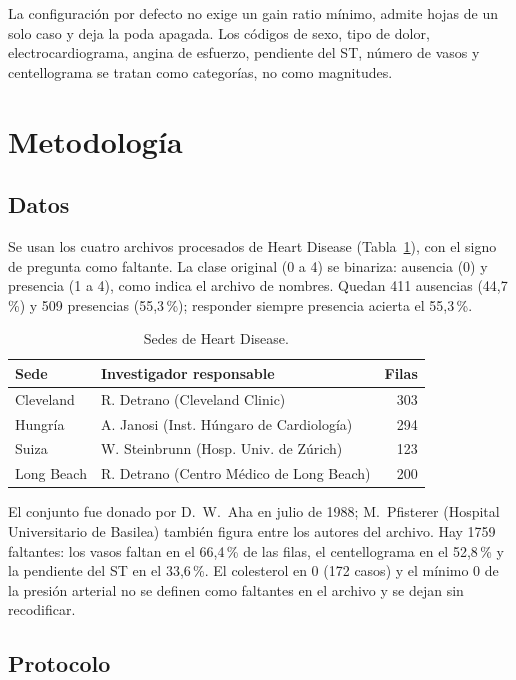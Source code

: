 \documentclass{llncs}
\begin{document}
La configuración por defecto no exige un gain ratio mínimo, admite hojas de un solo caso y deja la poda apagada. Los códigos de sexo, tipo de dolor, electrocardiograma, angina de esfuerzo, pendiente del ST, número de vasos y centellograma se tratan como categorías, no como magnitudes.

\section{Metodología}
\label{sec:metodologia}

\subsection{Datos}

Se usan los cuatro archivos procesados de Heart Disease \cite{heartdisease} (Tabla~\ref{tab:sedes}), con el signo de pregunta como faltante. La clase original (0 a 4) se binariza: ausencia (0) y presencia (1 a 4), como indica el archivo de nombres. Quedan 411 ausencias (44,7\,\%) y 509 presencias (55,3\,\%); responder siempre presencia acierta el 55,3\,\%.

\begin{table}[ht]
\centering
\caption{Sedes de Heart Disease.}
\label{tab:sedes}
\begin{tabular}{llr}
\toprule
Sede & Investigador responsable & Filas \\
\midrule
Cleveland & R. Detrano (Cleveland Clinic) & 303 \\
Hungría & A. Janosi (Inst. Húngaro de Cardiología) & 294 \\
Suiza & W. Steinbrunn (Hosp. Univ. de Zúrich) & 123 \\
Long Beach & R. Detrano (Centro Médico de Long Beach) & 200 \\
\bottomrule
\end{tabular}
\end{table}

El conjunto fue donado por D.~W.~Aha en julio de 1988; M.~Pfisterer (Hospital Universitario de Basilea) también figura entre los autores del archivo. Hay 1759 faltantes: los vasos faltan en el 66,4\,\% de las filas, el centellograma en el 52,8\,\% y la pendiente del ST en el 33,6\,\%. El colesterol en 0 (172 casos) y el mínimo 0 de la presión arterial no se definen como faltantes en el archivo y se dejan sin recodificar.

\subsection{Protocolo}
\end{document}

